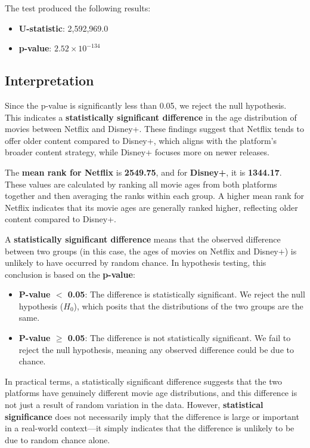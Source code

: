 \documentclass[a4paper, 12pt]{article}
\begin{document}
The test produced the following results:
\begin{itemize}
    \item \textbf{U-statistic}: 2,592,969.0
    \item \textbf{p-value}: \(2.52 \times 10^{-134}\)
\end{itemize}

\subsection*{Interpretation}
Since the p-value is significantly less than 0.05, we reject the null hypothesis. This indicates a \textbf{statistically significant difference} in the age distribution of movies between Netflix and Disney+. These findings suggest that Netflix tends to offer older content compared to Disney+, which aligns with the platform's broader content strategy, while Disney+ focuses more on newer releases.

The \textbf{mean rank for Netflix} is \textbf{2549.75}, and for \textbf{Disney+}, it is \textbf{1344.17}. These values are calculated by ranking all movie ages from both platforms together and then averaging the ranks within each group. A higher mean rank for Netflix indicates that its movie ages are generally ranked higher, reflecting older content compared to Disney+.

A \textbf{statistically significant difference} means that the observed difference between two groups (in this case, the ages of movies on Netflix and Disney+) is unlikely to have occurred by random chance. In hypothesis testing, this conclusion is based on the \textbf{p-value}:

\begin{itemize}
    \item \textbf{P-value $<$ 0.05}: The difference is statistically significant. We reject the null hypothesis (\(H_0\)), which posits that the distributions of the two groups are the same.
    \item \textbf{P-value $\geq$ 0.05}: The difference is not statistically significant. We fail to reject the null hypothesis, meaning any observed difference could be due to chance.
\end{itemize}

In practical terms, a statistically significant difference suggests that the two platforms have genuinely different movie age distributions, and this difference is not just a result of random variation in the data. However, \textbf{statistical significance} does not necessarily imply that the difference is large or important in a real-world context—it simply indicates that the difference is unlikely to be due to random chance alone.
\end{document}
